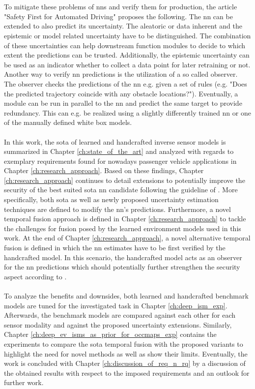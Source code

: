 \\\\
To mitigate these problems of \gls{nn}s and verify them for production, the article "Safety First for Automated Driving" \cite{safetyfirst2019} proposes the following. The \gls{nn} can be extended to also predict its uncertainty. The aleatoric or data inherent and the epistemic or model related uncertainty have to be distinguished. The combination of these uncertainties can help downstream function modules to decide to which extent the predictions can be trusted. Additionally, the epistemic uncertainty can be used as an indicator whether to collect a data point for later retraining or not. Another way to verify \gls{nn} predictions is the utilization of a so called observer. The observer checks the predictions of the \gls{nn} e.g. given a set of rules (e.g. "Does the predicted trajectory coincide with any obstacle locations?"). Eventually, a module can be run in parallel to the \gls{nn} and predict the same target to provide redundancy. This can e.g. be realized using a slightly differently trained \gls{nn} or one of the manually defined white box models.
\\\\
In this work, the \gls{sota} of learned and handcrafted inverse sensor models is summarized in Chapter \ref{ch:state_of_the_art} and analyzed with regards to exemplary requirements found for nowadays passenger vehicle applications in Chapter \ref{ch:research_approach}. Based on these findings, Chapter \ref{ch:research_approach} continues to detail extensions to potentially improve the security of the best suited \gls{sota} \gls{nn} candidate following the guideline of \cite{safetyfirst2019}. More specifically, both \gls{sota} as well as newly proposed uncertainty estimation techniques are defined to modify the \gls{nn}'s predictions. Furthermore, a novel temporal fusion approach is defined in Chapter \ref{ch:research_approach} to tackle the challenges for fusion posed by the learned environment models used in this work. At the end of Chapter \ref{ch:research_approach}, a novel alternative temporal fusion is defined in which the \gls{nn} estimates have to be first verified by the handcrafted model. In this scenario, the handcrafted model acts as an observer for the \gls{nn} predictions which should potentially further strengthen the security aspect according to \cite{safetyfirst2019}.
\\\\
To analyze the benefits and downsides, both learned and handcrafted benchmark models are tuned for the investigated task in Chapter \ref{ch:deep_ism_exp}. Afterwards, the benchmark models are compared against each other for each sensor modality and against the proposed uncertainty extensions. Similarly, Chapter \ref{ch:deep_ev_isms_as_prior_for_occmaps_exp} contains the experiments to compare the \gls{sota} temporal fusion with the proposed variants to highlight the need for novel methods as well as show their limits. Eventually, the work is concluded with Chapter \ref{ch:discussion_of_req_n_rq} by a discussion of the obtained results with respect to the imposed requirements and an outlook for further work.

